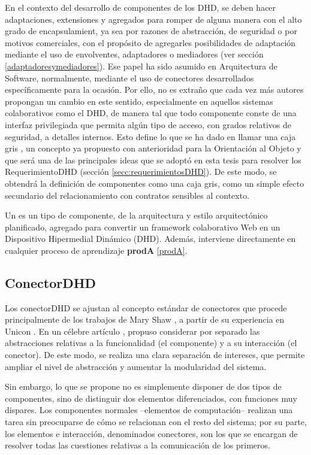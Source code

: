 En el contexto del desarrollo de componentes de los DHD, se deben
hacer adaptaciones, extensiones y agregados para romper de alguna manera con el 
alto grado de encapsulamient, ya sea por razones de abstracción, de seguridad o por
motivos comerciales, con el propósito de agregarles posibilidades de
adaptación mediante el uso de envolventes, adaptadores o mediadores
(ver sección \ref{adaptadoresymediadores}). Ese papel ha sido asumido
en Arquitectura de Software, normalmente, mediante el uso de
conectores desarrollados específicamente para la ocasión. Por ello, no
es extraño que cada vez más autores propongan un cambio
en este sentido, especialmente en aquellos sistemas colaborativos como el DHD, de manera tal que todo componente conste de una interfaz privilegiada que permita algún
tipo de acceso, con grados relativos de seguridad, a detalles internos. Esto
define lo que se ha dado en llamar una caja gris \cite{cacic2007.7}, un concepto ya
propuesto con anterioridad para la Orientación al Objeto \cite{KLM+97, HL95} y que
será una de las principales ideas que se adoptó en esta tesis para resolver los
RequerimientoDHD (sección \ref{secc:requerimientosDHD}). De este modo, se obtendrá
la definición de componentes como una caja gris, como un simple efecto
secundario del relacionamiento con contratos sensibles al contexto.

\begin{def}
Un \cite{componenteDHD} es un tipo de componente, de la arquitectura y estilo arquitectónico planificado, agregado para convertir un framework colaborativo Web en un  Dispositivo Hipermedial Dinámico (DHD). Además, interviene directamente en cualquier proceso de aprendizaje \textbf{prodA} \ref{prodA}.
\end{def}


\subsection{ConectorDHD}

Los conectorDHD se ajustan al concepto estándar de conectores que procede principalmente de los trabajos de Mary
Shaw  \cite{SG96}, a partir de su experiencia en Unicon \cite{SDK95}. En un célebre artículo \cite{Sha94}, propuso considerar por separado las abstracciones relativas a la funcionalidad (el componente) y a su interacción (el conector). De este modo, se realiza una clara separación de intereses, que permite ampliar el nivel de abstracción y aumentar la modularidad del sistema.

Sin embargo, lo que se propone no es simplemente disponer de dos tipos de
componentes, sino de distinguir dos elementos diferenciados, con funciones muy
dispares. Los componentes normales –elementos de computación– realizan una
tarea sin preocuparse de cómo se relacionan con el resto del sistema; por su
parte, los elementos e interacción, denominados conectores, son los que se
encargan de resolver todas las cuestiones relativas a la comunicación de los
primeros.

